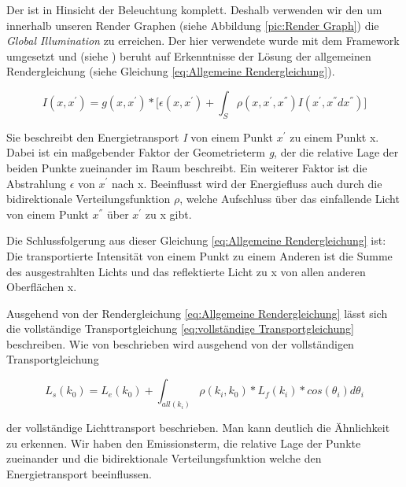 \par 

Der  ist in Hinsicht der Beleuchtung komplett. 
Deshalb verwenden wir den  um innerhalb unseren Render Graphen
(siehe Abbildung \ref{pic:Render Graph}) die \textit{Global Illumination} zu erreichen. 
Der hier verwendete  wurde mit dem Framework umgesetzt und
(siehe \cite{Benty18}) beruht auf Erkenntnisse der Lösung der allgemeinen Rendergleichung
(siehe Gleichung \ref{eq:Allgemeine Rendergleichung}).

\begin{equation}\label{eq:Allgemeine Rendergleichung}
    I(x,{x}^{'}) = g(x,{x}^{'}) * \biggl[\epsilon(x,{x}^{'}) + 
    \int_{S}^{} \rho(x,{x}^{'},{x}^{''})
    I({x}^{'},{x}^{''}d{x}^{''})\biggr] 
\end{equation}

Sie beschreibt den Energietransport \textit{I} von einem Punkt ${x}^{'}$
zu einem Punkt x. Dabei ist ein maßgebender Faktor der Geometrieterm \textit{g},
der die relative Lage der beiden Punkte zueinander im Raum beschreibt.
Ein weiterer Faktor ist die Abstrahlung \textit{$\epsilon$} von ${x}^{'}$ nach x. 
Beeinflusst wird der Energiefluss auch durch
die bidirektionale Verteilungsfunktion \textit{$\rho$}, welche Aufschluss über
das einfallende Licht von einem Punkt ${x}^{''}$ über ${x}^{'}$ zu x gibt.\par
Die Schlussfolgerung aus dieser Gleichung \ref{eq:Allgemeine Rendergleichung} ist: Die transportierte
Intensität von einem Punkt zu einem Anderen ist die Summe des ausgestrahlten Lichts 
und das reflektierte Licht zu x von allen anderen Oberflächen x.

Ausgehend von der Rendergleichung \ref{eq:Allgemeine Rendergleichung} lässt sich
die vollständige Transportgleichung \ref{eq:vollständige Transportgleichung}
beschreiben.
Wie von \cite{marschner2009fundamentals} beschrieben wird ausgehend von der vollständigen Transportgleichung

\begin{equation}\label{eq:vollständige Transportgleichung}
    L_s(k_0) = L_e(k_0) + \int_{all(k_i)}^{} \rho(k_i, k_0)*L_f(k_i)*cos(\theta_i)d\theta_i
\end{equation}

der vollständige Lichttransport beschrieben. Man kann deutlich die Ähnlichkeit
zu  erkennen. Wir haben den Emissionsterm, die relative Lage der 
Punkte zueinander und die bidirektionale Verteilungsfunktion welche den Energietransport
beeinflussen.


